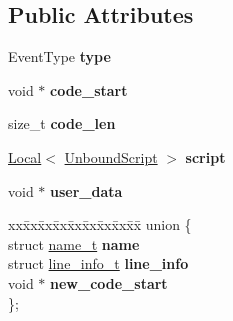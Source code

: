 \subsection*{Public Attributes}
\begin{DoxyCompactItemize}
\item 
Event\+Type {\bfseries type}\hypertarget{structv8_1_1_jit_code_event_ace1fbc4119ac3ef609d8e0f89cbc2c9f}{}\label{structv8_1_1_jit_code_event_ace1fbc4119ac3ef609d8e0f89cbc2c9f}

\item 
void $\ast$ {\bfseries code\+\_\+start}\hypertarget{structv8_1_1_jit_code_event_aeeac614e6c125bf08bf785b070090d0f}{}\label{structv8_1_1_jit_code_event_aeeac614e6c125bf08bf785b070090d0f}

\item 
size\+\_\+t {\bfseries code\+\_\+len}\hypertarget{structv8_1_1_jit_code_event_ad56f78749d03f5db29ed417c2f3b4666}{}\label{structv8_1_1_jit_code_event_ad56f78749d03f5db29ed417c2f3b4666}

\item 
\hyperlink{classv8_1_1_local}{Local}$<$ \hyperlink{classv8_1_1_unbound_script}{Unbound\+Script} $>$ {\bfseries script}\hypertarget{structv8_1_1_jit_code_event_a50ac4979f3d15900647b6b29dae3db76}{}\label{structv8_1_1_jit_code_event_a50ac4979f3d15900647b6b29dae3db76}

\item 
void $\ast$ {\bfseries user\+\_\+data}\hypertarget{structv8_1_1_jit_code_event_a90597e06440ebd68fe582bd1361d6de6}{}\label{structv8_1_1_jit_code_event_a90597e06440ebd68fe582bd1361d6de6}

\item 
\begin{tabbing}
xx\=xx\=xx\=xx\=xx\=xx\=xx\=xx\=xx\=\kill
union \{\\
\>struct \hyperlink{structv8_1_1_jit_code_event_1_1name__t}{name\_t} {\bfseries name}\\
\>struct \hyperlink{structv8_1_1_jit_code_event_1_1line__info__t}{line\_info\_t} {\bfseries line\_info}\\
\>void $\ast$ {\bfseries new\_code\_start}\\
\}; \hypertarget{structv8_1_1_jit_code_event_a4c66ebaa0d14b47a28601446150ae617}{}\label{structv8_1_1_jit_code_event_a4c66ebaa0d14b47a28601446150ae617}
\\

\end{tabbing}\end{DoxyCompactItemize}


